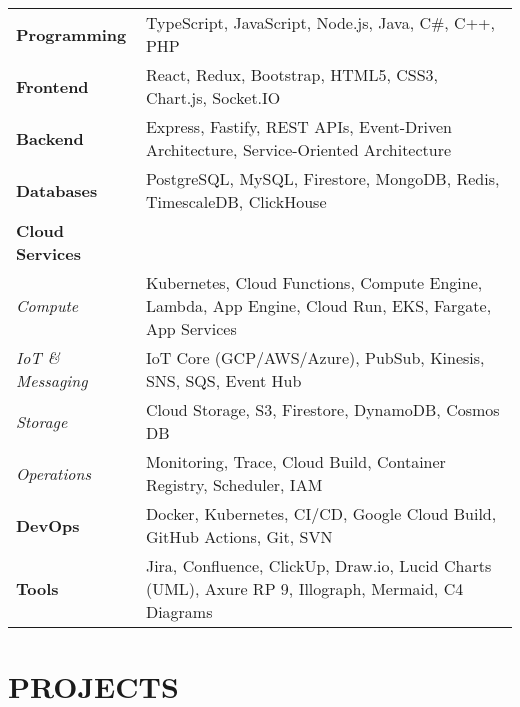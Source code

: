 \documentclass{fullstackdeveloper-ats}
\begin{document}
\begin{tabular}{p{3.5cm}p{13cm}}
\textbf{Programming} & TypeScript, JavaScript, Node.js, Java, C\#, C++, PHP \\[0.2cm]

\textbf{Frontend} & React, Redux, Bootstrap, HTML5, CSS3, Chart.js, Socket.IO \\[0.2cm]

\textbf{Backend} & Express, Fastify, REST APIs, Event-Driven Architecture, Service-Oriented Architecture \\[0.2cm]

\textbf{Databases} & PostgreSQL, MySQL, Firestore, MongoDB, Redis, TimescaleDB, ClickHouse \\[0.2cm]

\textbf{Cloud Services} & \\
\hspace{0.5cm}\textit{Compute} & Kubernetes, Cloud Functions, Compute Engine, Lambda, App Engine, Cloud Run, EKS, Fargate, App Services \\[0.1cm]
\hspace{0.5cm}\textit{IoT \& Messaging} & IoT Core (GCP/AWS/Azure), PubSub, Kinesis, SNS, SQS, Event Hub \\[0.1cm]
\hspace{0.5cm}\textit{Storage} & Cloud Storage, S3, Firestore, DynamoDB, Cosmos DB \\[0.1cm]
\hspace{0.5cm}\textit{Operations} & Monitoring, Trace, Cloud Build, Container Registry, Scheduler, IAM \\[0.2cm]

\textbf{DevOps} & Docker, Kubernetes, CI/CD, Google Cloud Build, GitHub Actions, Git, SVN \\[0.2cm]

\textbf{Tools} & Jira, Confluence, ClickUp, Draw.io, Lucid Charts (UML), Axure RP 9, Illograph, Mermaid, C4 Diagrams \\
\end{tabular}

\section{PROJECTS}
\end{document}
